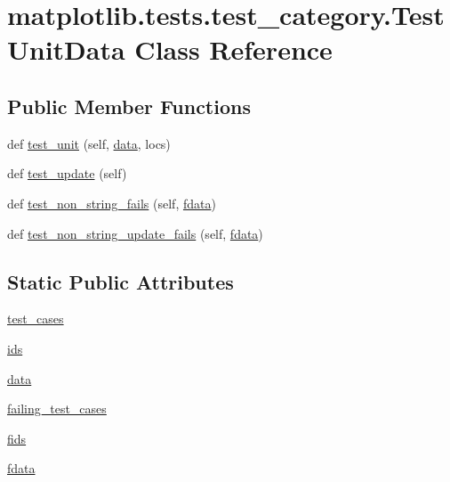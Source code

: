 \hypertarget{classmatplotlib_1_1tests_1_1test__category_1_1TestUnitData}{}\section{matplotlib.\+tests.\+test\+\_\+category.\+Test\+Unit\+Data Class Reference}
\label{classmatplotlib_1_1tests_1_1test__category_1_1TestUnitData}
\subsection*{Public Member Functions}
\begin{DoxyCompactItemize}
\item 
def \hyperlink{classmatplotlib_1_1tests_1_1test__category_1_1TestUnitData_a0efbb080265bec1cf07cf480ac2b1787}{test\+\_\+unit} (self, \hyperlink{classmatplotlib_1_1tests_1_1test__category_1_1TestUnitData_a3097d5ec4054e2228ccc74607ea56c75}{data}, locs)
\item 
def \hyperlink{classmatplotlib_1_1tests_1_1test__category_1_1TestUnitData_a5a7af7d2cd95d90a248ba5793c248557}{test\+\_\+update} (self)
\item 
def \hyperlink{classmatplotlib_1_1tests_1_1test__category_1_1TestUnitData_a606802aaf6aa8ba69c92d1cf0e26659f}{test\+\_\+non\+\_\+string\+\_\+fails} (self, \hyperlink{classmatplotlib_1_1tests_1_1test__category_1_1TestUnitData_a82bca08e14a0129a9bf02a40b165f9b9}{fdata})
\item 
def \hyperlink{classmatplotlib_1_1tests_1_1test__category_1_1TestUnitData_af7160ab0fad5aea1f79c69b1a2941fdd}{test\+\_\+non\+\_\+string\+\_\+update\+\_\+fails} (self, \hyperlink{classmatplotlib_1_1tests_1_1test__category_1_1TestUnitData_a82bca08e14a0129a9bf02a40b165f9b9}{fdata})
\end{DoxyCompactItemize}
\subsection*{Static Public Attributes}
\begin{DoxyCompactItemize}
\item 
\hyperlink{classmatplotlib_1_1tests_1_1test__category_1_1TestUnitData_a3def7bdeaea3aaae3a19346d7b8874e1}{test\+\_\+cases}
\item 
\hyperlink{classmatplotlib_1_1tests_1_1test__category_1_1TestUnitData_a99bde04bef7c90d24714d43fa79aff47}{ids}
\item 
\hyperlink{classmatplotlib_1_1tests_1_1test__category_1_1TestUnitData_a3097d5ec4054e2228ccc74607ea56c75}{data}
\item 
\hyperlink{classmatplotlib_1_1tests_1_1test__category_1_1TestUnitData_aeee109ddbba8222c31e1ec6c6e1eb612}{failing\+\_\+test\+\_\+cases}
\item 
\hyperlink{classmatplotlib_1_1tests_1_1test__category_1_1TestUnitData_a72d163f4fc262356dbb79f1ef565d940}{fids}
\item 
\hyperlink{classmatplotlib_1_1tests_1_1test__category_1_1TestUnitData_a82bca08e14a0129a9bf02a40b165f9b9}{fdata}
\end{DoxyCompactItemize}


